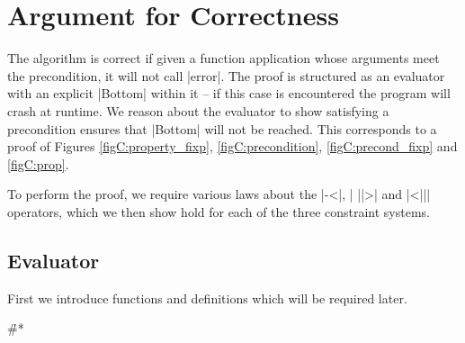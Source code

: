 \begin{comment}
instance Eq Val
instance Eq Expr

alt :: Alt -> Prop (Sat a)
pre' :: String -> [Expr] -> Prop (Sat Expr)
sub :: ([VarName],[Expr])

-- for BP
anys :: String -> Constraint
\end{code}

\h{#mp}\begin{code}
-- for MP
type Constraint = [ValMP]
data ValMP = [Pattern] :* [Pattern]
data Pattern = Pattern CtorName [ValMP]
complete :: CtorName -> Pattern
\end{code}
\end{comment}


\section{Argument for Correctness}
\label{secC:correct}

\newcommand{\lemma}[1]{(\textit{#1})}
\newcommand{\theorem}[2]{#2 \hspace{5mm} \lemma{#1} \\}
\newcommand{\proof}[2][]{\paragraph{\lemma{#2} \textsf{#1}}}

The algorithm is correct if given a function application whose arguments meet the precondition, it will not call |error|. The proof is structured as an evaluator with an explicit |Bottom| within it -- if this case is encountered the program will crash at runtime. We reason about the evaluator to show satisfying a precondition ensures that |Bottom| will not be reached. This corresponds to a proof of Figures \ref{figC:property_fixp}, \ref{figC:precondition}, \ref{figC:precond_fixp} and \ref{figC:prop}.

To perform the proof, we require various laws about the |-<|, | ||>| and |<||| operators, which we then show hold for each of the three constraint systems.

\subsection{Evaluator}

First we introduce functions and definitions which will be required later.

\h{#*}


